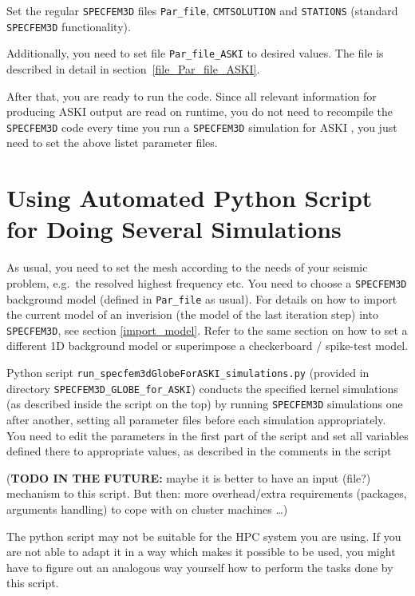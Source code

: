 \documentclass[12pt,a4paper]{article}
\newcommand{\lcode}[1]{\nolinkurl{#1}}
\newcommand{\ASKI}{ {\ttfamily ASKI} }
\begin{document}
Set the regular \lcode{SPECFEM3D} files \lcode{Par_file}, \lcode{CMTSOLUTION} 
and \lcode{STATIONS} (standard \lcode{SPECFEM3D} functionality).

Additionally, you need to set file \lcode{Par_file_ASKI} to desired values. The file is described 
in detail in section~\ref{file_Par_file_ASKI}. 

After that, you are ready to run the code. Since all relevant information for producing \ASKI output 
are read on runtime, you do not need to recompile the \lcode{SPECFEM3D} code every time you
run a \lcode{SPECFEM3D} simulation for \ASKI, you just need to set the above listet parameter files.
%
\section{Using Automated Python Script for Doing Several Simulations} \label{use_script}
%
As usual, you need to set the mesh according to the needs of your seismic problem, e.g.\ the
resolved highest frequency etc. You need to choose a \lcode{SPECFEM3D} background model (defined
in \lcode{Par_file} as usual). For details on how to import the current model of an inverision 
(the model of the last iteration step) into \lcode{SPECFEM3D}, see section \ref{import_model}.
Refer to the same section on how to set a different 1D background model or superimpose a 
checkerboard / spike-test model.

Python script \lcode{run_specfem3dGlobeForASKI_simulations.py} (provided in directory 
\lcode{SPECFEM3D_GLOBE_for_ASKI}) conducts the specified 
kernel simulations (as described inside the script on the top) by running 
\lcode{SPECFEM3D} simulations one after another, setting all parameter files before each simulation appropriately.
You need to edit the parameters in the first part of the script and set all variables defined 
there to appropriate values, as described in the comments in the script 

({\bf TODO IN THE FUTURE:} maybe it is better to have an input (file?) mechanism to this script. But then: more
overhead/extra requirements (packages, arguments handling) to cope with on cluster machines \dots)

The python script may not be suitable for the HPC system you are using. If you are not able to adapt 
it in a way which makes it possible to be used, you might have to figure out an analogous way yourself 
how to perform the tasks done by this script.
\end{document}
